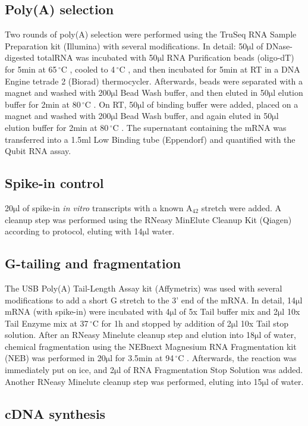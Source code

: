 \documentclass[10pt]{article}
\newcommand{\mul}{\ensuremath{\mathrm{\mu l}} }
\newcommand{\C}{\,$^{\circ}\mathrm{C}$ }
\begin{document}
\subsection*{Poly(A) selection}

Two rounds of poly(A) selection were performed using the TruSeq RNA Sample Preparation kit (Illumina) with several modifications. In detail: 50\mul of DNase-digested totalRNA was incubated with 50\mul RNA Purification beads (oligo-dT) for 5min at 65\C, cooled to 4\C, and then incubated for 5min at RT in a DNA Engine tetrade 2 (Biorad) thermocycler. Afterwards, beads were separated with a magnet and washed with 200\mul Bead Wash buffer, and then eluted in 50\mul elution buffer for 2min at 80\C. On RT, 50\mul of binding buffer were added, placed on a magnet and washed with 200\mul Bead Wash buffer, and again eluted in 50\mul elution buffer for 2min at 80\C. The supernatant containing the mRNA was transferred into a 1.5ml Low Binding tube (Eppendorf) and quantified with the Qubit RNA assay.

\subsection*{Spike-in control}

20\mul of spike-in \textit{in vitro} transcripts with a known A$_{42}$ stretch \cite{pelechano13} were added. A cleanup step was performed using the RNeasy MinElute Cleanup Kit (Qiagen) according to protocol, eluting with 14\mul water.

\subsection*{G-tailing and fragmentation}

The USB Poly(A) Tail-Length Assay kit (Affymetrix) was used with several modifications to add a short G stretch to the 3$’$ end of the mRNA. In detail, 14\mul mRNA (with spike-in) were incubated with 4\mul of 5x Tail buffer mix and 2\mul 10x Tail Enzyme mix at 37\C for 1h and stopped by addition of 2\mul 10x Tail stop solution. After an RNeasy Minelute cleanup step and elution into 18\mul of water, chemical fragmentation using the NEBnext Magnesium RNA Fragmentation kit (NEB) was performed in 20\mul for 3.5min at 94\C. Afterwards, the reaction was immediately put on ice, and 2\mul of RNA Fragmentation Stop Solution was added. Another RNeasy Minelute cleanup step was performed, eluting into 15\mul of water.

\subsection*{cDNA synthesis}
\end{document}
